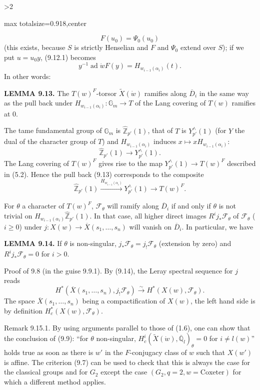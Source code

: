 \documentclass[9pt,twoside]{extarticle}
\newcommand{\EditionPage}[3]{%
  \ifnum#1>2\clearpage\fi
  \pdfbookmark[1]{Printed page #2}{en-folio-#2}%
  \hypertarget{en-physical-#1}{}%
  \noindent\begin{adjustbox}{max totalsize={\textwidth}{0.918\textheight},center}
  \begin{minipage}[t]{\textwidth}
  \fontsize{9.4}{11.1}\selectfont\justifying
  #3
  \end{minipage}
  \end{adjustbox}%
}
\begin{document}
\EditionPage{51}{152}{%
\[
F(u_0)=\Psi_0(u_0)
\] (this exists, because \(S\) is strictly Henselian and \(F\) and \(\Psi_0\) extend over \(S\)); if we put \(u=u_0y\), (9.12.1) becomes \[
\tag{9.12.2}
y^{-1}\operatorname{ad}\dot w F(y)=H_{w_{i-1}(\alpha_i)}(t).
\] In other words:\par

\noindent\textbf{LEMMA 9.13.} The \(T(w)^F\)-torsor \(\widetilde X(\dot w)\) ramifies along \(\overline D_i\) in the same way as the pull back under \(H_{w_{i-1}(\alpha_i)}:\mathbb G_m\to T\) of the Lang covering of \(T(w)\) ramifies at 0.\par

The tame fundamental group of \(\mathbb G_m\) is \(\widehat{\mathbb Z}_{p'}(1)\), that of \(T\) is \(Y_{p'}^{\wedge}(1)\) (for \(Y\) the dual of the character group of \(T\)) and \(H_{w_{i-1}(\alpha_i)}\) induces \(x\mapsto xH_{w_{i-1}(\alpha_i)}\): \[
\widehat{\mathbb Z}_{p'}(1)\longrightarrow Y_{p'}^{\wedge}(1).
\] The Lang covering of \(T(w)^F\) gives rise to the map \(Y_{p'}^{\wedge}(1)\to T(w)^F\) described in (5.2). Hence the pull back (9.13) corresponds to the composite \[
\widehat{\mathbb Z}_{p'}(1)
\xrightarrow{H_{w_{i-1}(\alpha_i)}}
Y_{p'}^{\wedge}(1)
\longrightarrow T(w)^F.
\]\par

For \(\theta\) a character of \(T(w)^F\), \(\mathcal F_\theta\) will ramify along \(\overline D_i\) if and only if \(\theta\) is not trivial on \(H_{w_{i-1}(\alpha_i)}\widehat{\mathbb Z}_{p'}(1)\). In that case, all higher direct images \(R^ij_*\mathcal F_\theta\) of \(\mathcal F_\theta\) (\(i\ge0\)) under \(j:X(w)\to\overline X(s_1,\ldots,s_n)\) will vanish on \(\overline D_i\). In particular, we have\par

\noindent\textbf{LEMMA 9.14.} If \(\theta\) is non-singular, \(j_*\mathcal F_\theta=j_!\mathcal F_\theta\) (extension by zero) and \(R^ij_*\mathcal F_\theta=0\) for \(i>0\).\par

Proof of 9.8 (in the guise 9.9.1). By (9.14), the Leray spectral sequence for \(j\) reads \[
H^*(\overline X(s_1,\ldots,s_n),j_!\mathcal F_\theta)
\xrightarrow{\sim}
H^*(X(w),\mathcal F_\theta).
\] The space \(\overline X(s_1,\ldots,s_n)\) being a compactification of \(X(w)\), the left hand side is by definition \(H_c^*(X(w),\mathcal F_\theta)\).\par

Remark 9.15.1. By using arguments parallel to those of (1.6), one can show that the conclusion of (9.9): “for \(\theta\) non-singular, \(H_c^i(\widetilde X(\dot w),\overline{\mathbb Q}_l)_\theta=0\) for \(i\ne l(w)\)” holds true as soon as there is \(w'\) in the \(F\)-conjugacy class of \(w\) such that \(X(w')\) is affine. The criterion (9.7) can be used to check that this is always the case for the classical groups and for \(G_2\) except the case \((G_2,q=2,w=\text{Coxeter})\) for which a different method applies.\par

}
\end{document}
